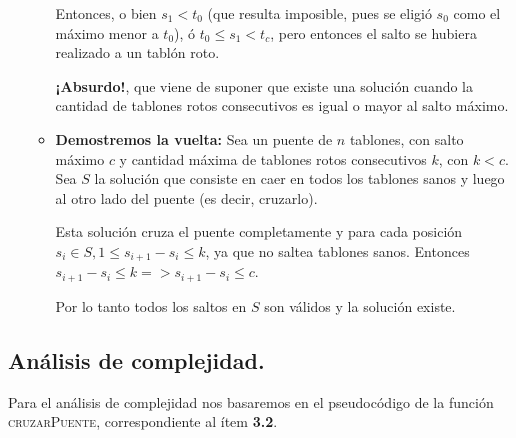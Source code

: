 \begin{itemize}
\begin{itemize}
Entonces, o bien $s_1 < t_0$ (que resulta imposible, pues se eligió $s_0$ como el máximo
menor a $t_0$), ó $t_0 \leq s_1 < t_c$, pero entonces el salto se hubiera realizado a un
tablón roto. \medskip

\textbf{¡Absurdo!}, que viene de suponer que existe una solución cuando la cantidad de
tablones rotos consecutivos es igual o mayor al salto máximo. \medskip

\item \textbf{Demostremos la vuelta:}
Sea un puente de $n$ tablones, con salto máximo $c$ y cantidad máxima de
tablones rotos consecutivos $k$, con $k < c$.
Sea $S$ la solución que consiste en caer en todos los tablones sanos y luego al
otro lado del puente (es decir, cruzarlo).

Esta solución cruza el puente completamente y para cada posición
$s_i \in S, 1 \leq s_{i+1} - s_i \leq k$, ya que no saltea tablones sanos.
Entonces $s_{i+1} - s_i \leq k => s_{i+1} - s_i \leq c$.

Por lo tanto todos los saltos en $S$ son válidos y la solución existe.
\end{itemize}

\end{itemize}



\subsection{Análisis de complejidad.}

\vspace*{0.3cm}

Para el análisis de complejidad nos basaremos en el pseudocódigo de la función
\textsc{cruzarPuente}, correspondiente al ítem \textbf{3.2}.

